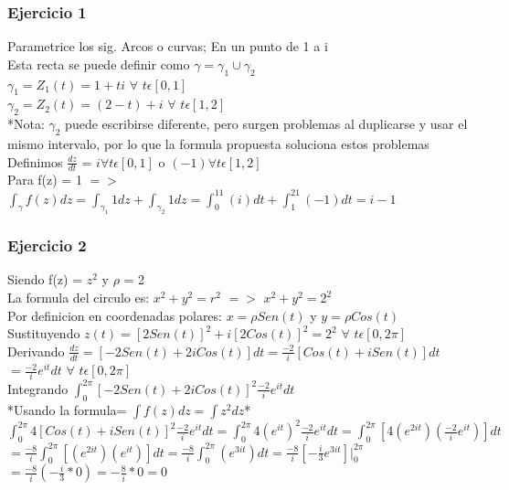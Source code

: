 \documentclass{article}
\begin{document}
\subsubsection*{Ejercicio 1}
Parametrice los sig. Arcos o curvas; En un punto de 1 a i
\\Esta recta se puede definir como $\gamma = \gamma_1 \cup \gamma_2$
\\$\gamma_1 = Z_1(t) = 1 + ti$ $\forall$ $t\epsilon[0,1]$
\\$\gamma_2 = Z_2(t) = (2-t) + i$ $\forall$ $t\epsilon[1,2]$
\\*Nota: $\gamma_2$ puede escribirse diferente, pero surgen problemas al duplicarse y usar el mismo intervalo, por lo que la formula propuesta soluciona estos problemas
\\Definimos $\frac{dz}{dt}$ = $i \forall t \epsilon [0,1]$ o $(-1) \forall t \epsilon [1,2]$
\\Para f(z) = 1 $=>$\\ $\int_\gamma f(z) dz = \int_{\gamma_1}1dz + \int_{\gamma_2}1dz = \int_0^11(i)dt + \int_1^21 (-1)dt = i-1$

\subsubsection*{Ejercicio 2}
Siendo f(z) = $z^2$ y $\rho$ = 2
\\La formula del circulo es: $x^2 + y^2 = r^2$ $=>$ $x^2 + y^2 = 2^2$
\\Por definicion en coordenadas polares: $x = \rho Sen(t)$ y $y = \rho Cos(t)$
\\Sustituyendo $z(t)=[2Sen(t)]^2 + i[2Cos(t)]^2 = 2^2$ $\forall$ $t\epsilon[0,2\pi]$
\\Derivando $\frac{dz}{dt}=[-2Sen(t) + 2iCos(t)]dt = \frac{-2}{i}[Cos(t) + iSen(t)]dt$\\$= \frac{-2}{i} e^{it}dt$ $\forall$ $t\epsilon[0,2\pi]$
\\Integrando $\int_0^{2\pi}[-2Sen(t) + 2iCos(t)]^2 \frac{-2}{i} e^{it}dt $ \\ *Usando la formula= $\int f(z)dz = \int z^2dz$*
\\$\int_0^{2\pi}4[Cos(t)+iSen(t)]^2 \frac{-2}{i} e^{it}dt= \int_0^{2\pi}4(e^{it})^2\frac{-2}{i} e^{it}dt = \int_0^{2\pi}[4(e^{2it})(\frac{-2}{i} e^{it})]dt$
\\$=\frac{-8}{i}\int_0^{2\pi}[(e^{2it})(e^{it})]dt=\frac{-8}{i}\int_0^{2\pi}(e^{3it})dt = \frac{-8}{i} [-\frac{i}{3} e^{3it}]| _0^{2\pi}$
\\$= \frac{-8}{i} (-\frac{i}{3} * 0) = -\frac{8}{i} * 0 = 0 $
\end{document}
